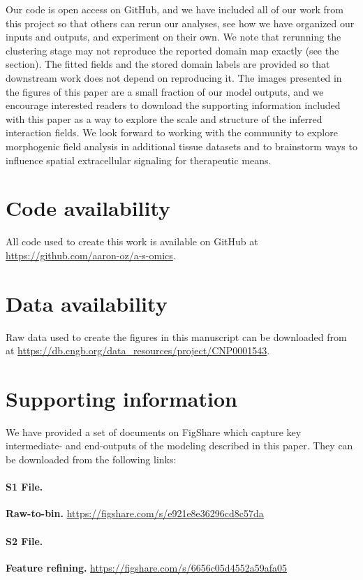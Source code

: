 \documentclass[10pt,letterpaper]{article}
\begin{document}
Our code is open access on GitHub, and we have included all of our work from this project so that others can rerun our analyses, see how we have organized our inputs and outputs, and experiment on their own. We note that rerunning the clustering stage may not reproduce the reported domain map exactly (see the  section). The fitted fields and the stored domain labels are provided so that downstream work does not depend on reproducing it. The images presented in the figures of this paper are a small fraction of our model outputs, and we encourage interested readers to download the supporting information included with this paper as a way to explore the scale and structure of the inferred interaction fields. We look forward to working with the community to explore morphogenic field analysis in additional tissue datasets and to brainstorm ways to influence spatial extracellular signaling for therapeutic means.

\section*{Code availability}\label{sec:code}

All code used to create this work is available on GitHub at \url{https://github.com/aaron-oz/a-s-omics}.

\section*{Data availability}

Raw data used to create the figures in this manuscript can be downloaded from \cite{Chen2022} at \url{https://db.cngb.org/data_resources/project/CNP0001543}.

\section*{Supporting information}

We have provided a set of documents on FigShare which capture key intermediate- and end-outputs of the modeling described in this paper. They can be downloaded from the following links:

\paragraph*{S1 File.}
\label{S1_File}
\textbf{Raw-to-bin.} \url{https://figshare.com/s/e921e8e36296cd8c57da}

\paragraph*{S2 File.}
\label{S2_File}
\textbf{Feature refining.} \url{https://figshare.com/s/6656c05d4552a59afa05}
\end{document}
